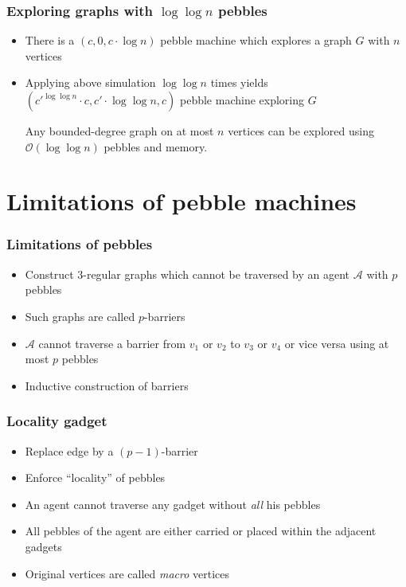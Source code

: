\documentclass{beamer}
\begin{document}
\begin{frame}
  \frametitle{Exploring graphs with $\log\log n$ pebbles}
  \begin{itemize}
    \item There is a $(c,0,c\cdot\log n)$ pebble machine which explores
      a graph $G$ with $n$ vertices
    \item Applying above simulation $\log \log n$ times yields
      $(c'^{\log\log n}\cdot c, c'\cdot\log\log n, c)$ pebble machine exploring
      $G$
      \begin{theorem}
        Any bounded-degree graph on at most $n$ vertices can be explored using
        $\mathcal{O}(\log\log n)$ pebbles and memory.
      \end{theorem}
  \end{itemize}
\end{frame}

\section{Limitations of pebble machines}
\begin{frame}
  \frametitle{Limitations of pebbles}
  \begin{itemize}
    \item Construct 3-regular graphs which cannot be traversed by an agent
      $\mathcal{A}$ with $p$ pebbles
    \item Such graphs are called $p$-barriers
      \begin{center}
        \resizebox{0.6\textwidth}{!}{}
      \end{center}
    \item $\mathcal{A}$ cannot traverse a barrier from $v_{1}$ or $v_{2}$
      to $v_{3}$ or $v_{4}$ or vice versa using at most $p$ pebbles
    \item Inductive construction of barriers
  \end{itemize}
\end{frame}

\begin{frame}
  \frametitle{Locality gadget}
  \begin{itemize}
    \item Replace edge by a $(p-1)$-barrier
    \item Enforce \enquote{locality} of pebbles
    \item An agent cannot traverse any gadget without \emph{all} his pebbles
    \item All pebbles of the agent are either carried or placed within the
      adjacent gadgets
      \begin{center}
      \end{center}
    \item<3-> Original vertices are called \emph{macro} vertices
  \end{itemize}
\end{frame}
\end{document}
